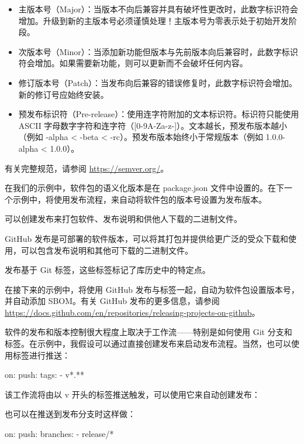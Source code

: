 \begin{itemize}
\item 
主版本号（Major）：当版本不向后兼容并具有破坏性更改时，此数字标识符会增加。升级到新的主版本号必须谨慎处理！主版本号为零表示处于初始开发阶段。

\item 
次版本号（Minor）：当添加新功能但版本与先前版本向后兼容时，此数字标识符会增加。如果需要新功能，则可以更新而不会破坏任何内容。

\item 
修订版本号（Patch）：当发布向后兼容的错误修复时，此数字标识符会增加。新的修订号应始终安装。

\item 
预发布标识符（Pre-release）：使用连字符附加的文本标识符。标识符只能使用 ASCII 字母数字字符和连字符（[0-9A-Za-z-]）。文本越长，预发布版本越小（例如 -alpha < -beta < -rc）。预发布版本始终小于常规版本（例如 1.0.0-alpha < 1.0.0）。
\end{itemize}

有关完整规范，请参阅 \url{https://semver.org/}。

在我们的示例中，软件包的语义化版本是在 package.json 文件中设置的。在下一个示例中，将使用发布流程，来自动将软件包的版本号设置为发布版本。


可以创建发布来打包软件、发布说明和供他人下载的二进制文件。

GitHub 发布是可部署的软件版本，可以将其打包并提供给更广泛的受众下载和使用，可以包含发布说明和其他可下载的二进制文件。

发布基于 Git 标签，这些标签标记了库历史中的特定点。

在接下来的示例中，将使用 GitHub 发布与标签一起，自动为软件包设置版本号，并自动添加 SBOM。有关 GitHub 发布的更多信息，请参阅 \url{https://docs.github.com/en/repositories/releasing-projects-on-github}。


软件的发布和版本控制很大程度上取决于工作流——特别是如何使用 Git 分支和标签。在示例中，我假设可以通过直接创建发布来启动发布流程。当然，也可以使用标签进行推送：

\begin{shell}
on:
  push:
    tags:
      - v*.**
\end{shell}

该工作流将由以 v 开头的标签推送触发，可以使用它来自动创建发布：


也可以在推送到发布分支时这样做：

\begin{shell}
on:
  push:
    branches:
      - release/*
\end{shell}






